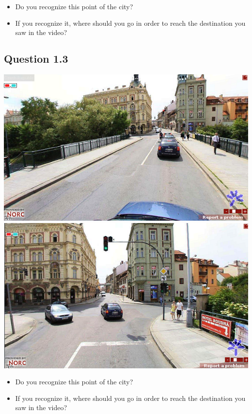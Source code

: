 \documentclass[12pt,a4paper,openright, notitlepage]{report}
\begin{document}
\begin{itemize}
	\item Do you recognize this point of the city?
	\item If you recognize it, where should you go in order to reach the destination you saw in the video?
\end{itemize}

\newpage

\subsection{Question 1.3}

\includegraphics[width=\textwidth]{imgs/image-question13-1}
\includegraphics[width=\textwidth]{imgs/image-question13-2}

\begin{itemize}
	\item Do you recognize this point of the city?
	\item If you recognize it, where should you go in order to reach the destination you saw in the video?
\end{itemize}
\end{document}
